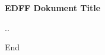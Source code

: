 \documentclass[10pt,a4paper]{article}
\begin{document}
\setlength{\parindent}{0pt}

\begin{center}
\huge
\vspace{1cm}

\textbf{EDFF Dokument Title}
\normalsize

\vspace{.5cm}
\the\day.\the\month.\the\year
\end{center}

\tableofcontents







\newpage 		%
\hspace{0pt}	%
\vfill			%
\centering		%
End				%
\vfill			%
\hspace{0pt}	%
\end{document}
